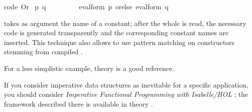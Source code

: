 \begin{isabellebody}
\isaantiq
code\ Or%
\endisaantiq
\ {\isacharparenleft}p{\isacharcomma}\ q{\isacharparenright}{\isacharparenright}\ {\isacharequal}\isanewline
\ \ \ \ \ \ \ \ eval{\isacharunderscore}form\ p\ orelse\ eval{\isacharunderscore}form\ q{\isacharsemicolon}\isanewline
{\isacharverbatimclose}%
\endisatagquotett
{\isafoldquotett}%
%
\isadelimquotett
%
\endisadelimquotett
%
\begin{isamarkuptext}%
\noindent {} takes as argument the name of a constant;  after the
  whole  is read, the necessary code is generated transparently
  and the corresponding constant names are inserted.  This technique also
  allows to use pattern matching on constructors stemming from compiled
  .

  For a less simplistic example, theory \hyperlink{theory.Ferrack}{\mbox{}} is
  a good reference.%
\end{isamarkuptext}%
\isamarkuptrue%
%
\isamarkuptrue%
%
\begin{isamarkuptext}%
If you consider imperative data structures as inevitable for a specific
  application, you should consider
  \emph{Imperative Functional Programming with Isabelle/HOL}
  \cite{bulwahn-et-al:2008:imperative};
  the framework described there is available in theory \hyperlink{theory.Imperative-HOL}{\mbox{}}.%
\end{isamarkuptext}%
\isamarkuptrue%
%
\isadelimtheory
%
\endisadelimtheory
%
\isatagtheory
{}\isamarkupfalse%
%
\endisatagtheory
{\isafoldtheory}%
%
\isadelimtheory
%
\endisadelimtheory
\isanewline
\end{isabellebody}%
